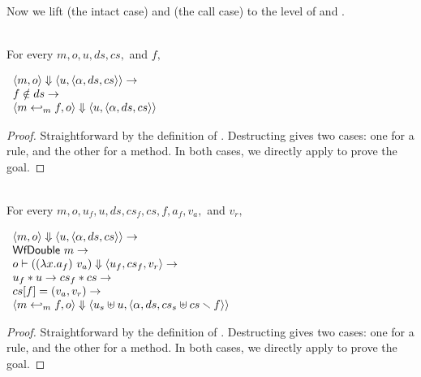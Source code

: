 Now we lift  (the intact case) and
 (the call case) to the level of
\Substep{} and \Substeps{}.

\begin{lemma}
  \label{lem-inlinedmm-substep-intact}
  \mbox{}\\
  For every $m, o, u, ds, cs,$ and $f,$
  \begin{center}
    \begin{math}
      \begin{array}{l}
        \langle m, o \rangle \Downarrow \langle u, \langle \alpha, ds, cs \rangle \rangle \to \\
        f \notin ds \to \\
        \langle m \hookleftarrow_{m}{} f, o \rangle \Downarrow \langle u, \langle \alpha, ds, cs \rangle \rangle
      \end{array}
    \end{math}
  \end{center}
\end{lemma}
\begin{proof}
  Straightforward by the definition of \Substep{}. Destructing
  \Substep{} gives two cases: one for a rule, and the other for a
  method. In both cases, we directly apply
   to prove the goal.
\end{proof}

\begin{lemma}
  \label{lem-inlinedmm-substep-call}
  \mbox{}\\
  For every $m, o, u_f, u, ds, cs_f, cs, f, a_f, v_a,$ and $v_r,$
  \begin{center}
    \begin{math}
      \begin{array}{l}
        \langle m, o \rangle \Downarrow \langle u, \langle \alpha, ds, cs \rangle \rangle \to \\
        \textsf{WfDouble}\ m \to \\
        o |- ((\lambda x.a_f)\ v_a) \Downarrow \langle u_f, cs_f, v_r \rangle \to \\
        u_f \ast u \to cs_f \ast cs \to \\
        cs[f] = (v_a, v_r) \to \\
        \langle m \hookleftarrow_{m}{} f, o \rangle \Downarrow \langle u_s \uplus u, \langle \alpha, ds, cs_s \uplus cs \smallsetminus{} f \rangle \rangle
      \end{array}
    \end{math}
  \end{center}
\end{lemma}
\begin{proof}
  Straightforward by the definition of \Substep{}. Destructing
  \Substep{} gives two cases: one for a rule, and the other for a
  method. In both cases, we directly apply
   to prove the goal.
\end{proof}

